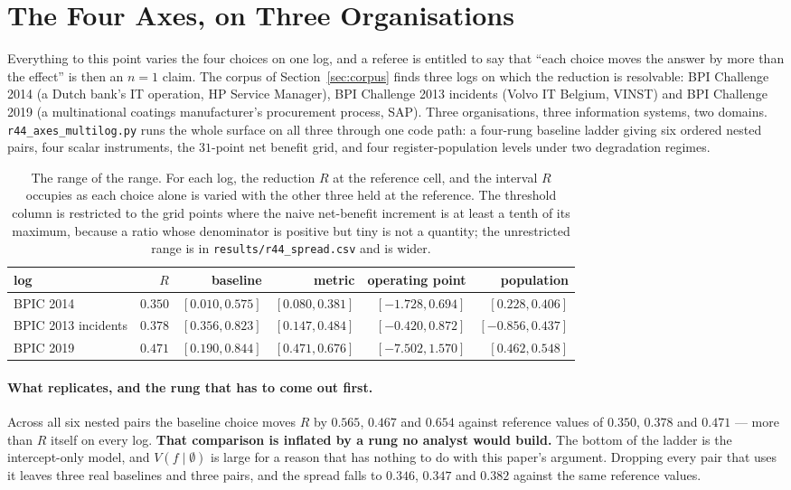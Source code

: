 \documentclass[preprint,12pt]{elsarticle}
\begin{document}
\section{The Four Axes, on Three Organisations}
\label{sec:threelogs}

Everything to this point varies the four choices on one log, and a referee is
entitled to say that ``each choice moves the answer by more than the effect''
is then an $n=1$ claim. The corpus of Section~\ref{sec:corpus} finds three
logs on which the reduction is resolvable: BPI Challenge 2014 (a Dutch bank's
IT operation, HP Service Manager), BPI Challenge 2013 incidents (Volvo IT
Belgium, VINST) and BPI Challenge 2019 (a multinational coatings
manufacturer's procurement process, SAP). Three organisations, three
information systems, two domains. \texttt{r44\_axes\_multilog.py} runs the
whole surface on all three through one code path: a four-rung baseline ladder
giving six ordered nested pairs, four scalar instruments, the $31$-point net
benefit grid, and four register-population levels under two degradation
regimes.

\begin{table}[htbp]
\centering
\caption{The range of the range. For each log, the reduction $R$ at the
reference cell, and the interval $R$ occupies as each choice alone is varied
with the other three held at the reference. The threshold column is
restricted to the grid points where the naive net-benefit increment is at
least a tenth of its maximum, because a ratio whose denominator is positive
but tiny is not a quantity; the unrestricted range is in
\texttt{results/r44\_spread.csv} and is wider.}
\label{tab:threelogs}
\begin{tabular}{lrrrrr}
\toprule
log & $R$ & baseline & metric & operating point & population \\
\midrule
BPIC 2014           & $0.350$ & $[0.010,0.575]$ & $[0.080,0.381]$ & $[-1.728,0.694]$ & $[0.228,0.406]$ \\
BPIC 2013 incidents & $0.378$ & $[0.356,0.823]$ & $[0.147,0.484]$ & $[-0.420,0.872]$ & $[-0.856,0.437]$ \\
BPIC 2019           & $0.471$ & $[0.190,0.844]$ & $[0.471,0.676]$ & $[-7.502,1.570]$ & $[0.462,0.548]$ \\
\bottomrule
\end{tabular}
\end{table}

\paragraph{What replicates, and the rung that has to come out first.}
Across all six nested pairs the baseline choice moves $R$ by $0.565$, $0.467$
and $0.654$ against reference values of $0.350$, $0.378$ and $0.471$ --- more
than $R$ itself on every log. \textbf{That comparison is inflated by a rung no
analyst would build.} The bottom of the ladder is the intercept-only model,
and $V(f \mid \emptyset)$ is large for a reason that has nothing to do with
this paper's argument. Dropping every pair that uses it leaves three real
baselines and three pairs, and the spread falls to $0.346$, $0.347$ and
$0.382$ against the same reference values.
\end{document}
